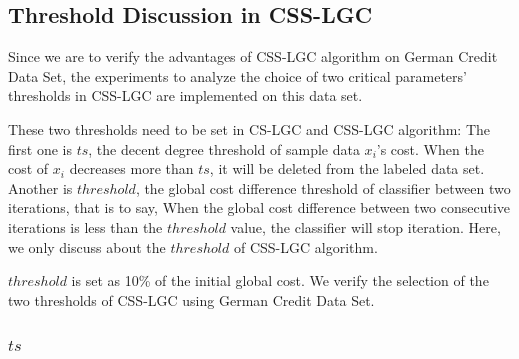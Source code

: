 \documentclass{svjour3}                     %
\begin{document}
\subsection{Threshold Discussion in CSS-LGC}
Since we are to verify the advantages of CSS-LGC algorithm on German Credit Data Set, the experiments to analyze the choice of two critical parameters' thresholds in CSS-LGC are implemented on this data set.

These two thresholds need to be set in CS-LGC and CSS-LGC algorithm: The first one is $ts$, the decent degree threshold of sample data $x_i$'s cost. When the cost of $x_i$ decreases more than $ts$, it will be deleted from the labeled data set. Another is $threshold$, the global cost difference threshold of classifier between two iterations, that is to say, When the global cost difference between two consecutive iterations is less than the $threshold$ value, the classifier will stop iteration. Here, we only discuss about the $threshold$ of CSS-LGC algorithm.

$threshold$ is set as 10\% of the initial global cost. We verify the selection of the two thresholds of CSS-LGC using German Credit Data Set.

\subsubsection{$ts$}
\end{document}
